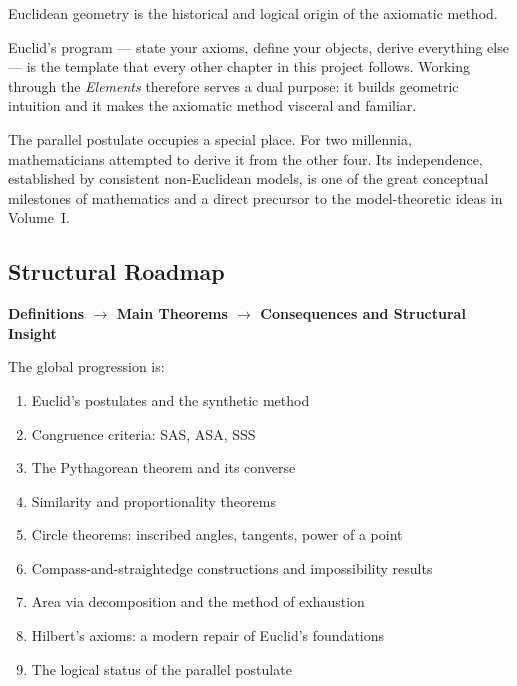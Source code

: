 
\begin{tcolorbox}[
  colback=gray!6,
  colframe=gray!40,
  arc=2pt,
  left=8pt, right=8pt, top=6pt, bottom=6pt,
  title={\small\textbf{Structural Role: Classical Geometry — The Axiomatic Template}},
  fonttitle=\small\bfseries
]
Euclidean geometry is the historical and logical origin of the
axiomatic method.

Euclid's program --- state your axioms, define your objects,
derive everything else --- is the template that every other
chapter in this project follows.
Working through the \textit{Elements} therefore serves a dual
purpose: it builds geometric intuition and it makes the
axiomatic method visceral and familiar.

The parallel postulate occupies a special place.
For two millennia, mathematicians attempted to derive it from
the other four.
Its independence, established by consistent non-Euclidean
models, is one of the great conceptual milestones of
mathematics and a direct precursor to the model-theoretic
ideas in Volume~I.
\end{tcolorbox}
\vspace{1em}

\subsection*{Structural Roadmap}

\begin{center}
\textbf{Definitions $\longrightarrow$ Main Theorems
$\longrightarrow$ Consequences and Structural Insight}
\end{center}

The global progression is:

\begin{enumerate}
  \item Euclid's postulates and the synthetic method
  \item Congruence criteria: SAS, ASA, SSS
  \item The Pythagorean theorem and its converse
  \item Similarity and proportionality theorems
  \item Circle theorems: inscribed angles, tangents, power of a point
  \item Compass-and-straightedge constructions and impossibility results
  \item Area via decomposition and the method of exhaustion
  \item Hilbert's axioms: a modern repair of Euclid's foundations
  \item The logical status of the parallel postulate
\end{enumerate}

